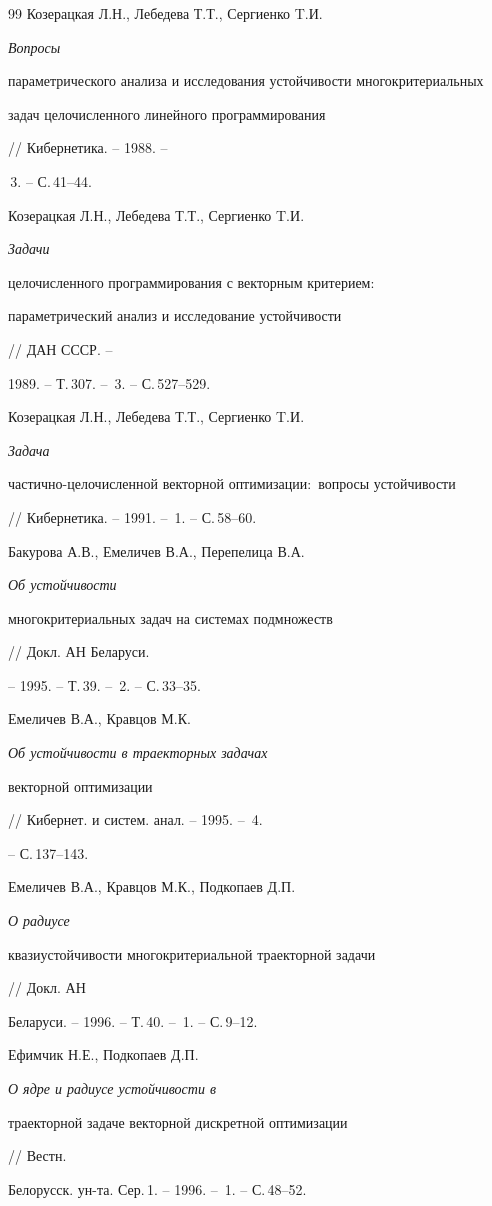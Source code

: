 \begin{thebibliography}{99}
Козерацкая Л.Н., Лебедева Т.Т., Сергиенко T.И. {\em Вопросы 


параметрического анализа и исследования устойчивости многокритериальных 


задач целочисленного линейного программирования} // Кибернетика. -- 1988. -- 


\No\,3. -- С.\,41--44. 




Козерацкая Л.Н., Лебедева Т.Т., Сергиенко T.И. {\em Задачи 


целочисленного программирования с векторным критерием$:$ 


параметрический анализ и исследование устойчивости} // ДАН СССР. -- 


1989. -- Т.\,307. -- \No\,3. -- С.\,527--529. 




Козерацкая Л.Н., Лебедева Т.Т., Сергиенко T.И. {\em Задача 


частично-целочисленной векторной оптимизации$:$ вопросы устойчивости} 


// Кибернетика. -- 1991. -- \No\,1. -- С.\,58--60. 




Бакурова А.В., Емеличев В.А., Перепелица В.А. {\em Об устойчивости 


многокритериальных задач на системах подмножеств} // Докл. АН Беларуси. 


-- 1995. -- Т.\,39. -- \No\,2. -- С.\,33--35. 




Емеличев В.А., Кравцов М.К. {\em Об устойчивости в траекторных задачах 


векторной оптимизации} // Кибернет. и систем. анал. -- 1995. -- \No\,4. 


-- С.\,137--143. 




Емеличев В.А., Кравцов М.К., Подкопаев Д.П. {\em О радиусе 


квазиустойчивости многокритериальной траекторной задачи} // Докл. АН 


Беларуси. -- 1996. -- Т.\,40. -- \No\,1. -- С.\,9--12. 




Ефимчик Н.Е., Подкопаев Д.П. {\em О ядре и радиусе устойчивости в 


траекторной задаче векторной дискретной оптимизации} // Вестн. 


Белорусск. ун-та. Сер.\,1. -- 1996. -- \No\,1. -- С.\,48--52. 



\end{thebibliography}
